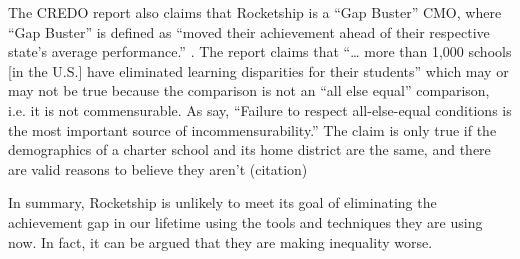 The CREDO report also claims that Rocketship is a ``Gap Buster'' CMO, where ``Gap Buster'' is defined as ``moved their achievement ahead of their respective state’s average performance.'' \parencite[14]{Raymond.etal2023}. The report claims that ``\ldots{} more than 1,000 schools [in the U.S.] have eliminated learning disparities for their students'' \parencite[14]{Raymond.etal2023} which may or may not be true because the comparison is not an ``all else equal'' comparison, i.e. it is not commensurable. As \textcite[16]{Ashworth.etal2021} say, ``Failure to respect all-else-equal conditions is the most important source of incommensurability.'' The claim is only true if the demographics of a charter school and its home district are the same, and there are valid reasons to believe they aren't (citation)

In summary, Rocketship is unlikely to meet its goal of eliminating the achievement gap in our lifetime using the tools and techniques they are using now. In fact, it can be argued that they are making inequality worse.

